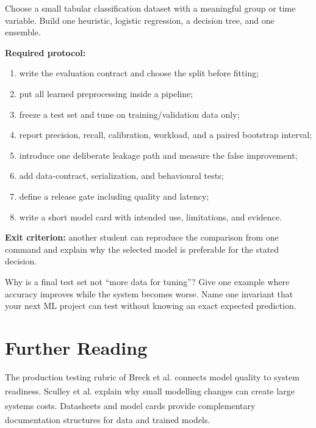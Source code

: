 \begin{practicallab}
Choose a small tabular classification dataset with a meaningful group or time
variable.
Build one heuristic, logistic regression, a decision tree, and one ensemble.

\textbf{Required protocol:}
\begin{enumerate}
    \item write the evaluation contract and choose the split before fitting;
    \item put all learned preprocessing inside a pipeline;
    \item freeze a test set and tune on training/validation data only;
    \item report precision, recall, calibration, workload, and a paired
          bootstrap interval;
    \item introduce one deliberate leakage path and measure the false
          improvement;
    \item add data-contract, serialization, and behavioural tests;
    \item define a release gate including quality and latency;
    \item write a short model card with intended use, limitations, and evidence.
\end{enumerate}

\textbf{Exit criterion:}
another student can reproduce the comparison from one command and explain why
the selected model is preferable for the stated decision.
\end{practicallab}

\begin{checkpoint}
Why is a final test set not ``more data for tuning''?
Give one example where accuracy improves while the system becomes worse.
Name one invariant that your next ML project can test without knowing an exact
expected prediction.
\end{checkpoint}

\section{Further Reading}

The production testing rubric of Breck et al. connects model quality to system
readiness.\textsuperscript{\cite{breckMLTestScore2017}}
Sculley et al. explain why small modelling changes can create large systems
costs.\textsuperscript{\cite{sculleyHiddenTechnicalDebt2015}}
Datasheets and model cards provide complementary documentation structures for
data and trained
models.\textsuperscript{\cite{gebruDatasheetsDatasets2021,
mitchellModelCardsModel2019}}
